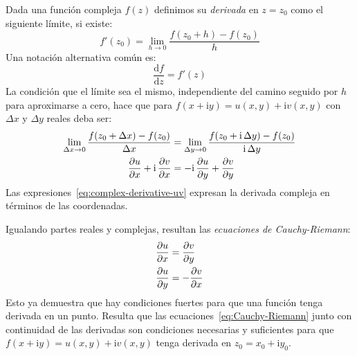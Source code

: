   Dada una función compleja \(f(z)\)
  definimos su \emph{derivada} en \(z = z_0\)%
  como el siguiente límite,
  si existe:
  \begin{equation}
    \label{eq:complex-derivative}
    f'(z_0)
      = \lim_{h \rightarrow 0} \frac{f(z_0 + h) - f(z_0)}{h}
  \end{equation}
  Una notación alternativa común es:
  \begin{equation*}
    \frac{\mathrm{d} f}{\mathrm{d} z}
      = f'(z)
  \end{equation*}
  La condición que el límite sea el mismo,
  independiente del camino seguido por \(h\)
  para aproximarse a cero,
  hace que para
    \(f(x + \mathrm{i} y) = u(x, y) + \mathrm{i} v(x, y)\)
  con \(\Delta x\) y \(\Delta y\) reales deba ser:
  \begin{align}
    \lim_{\Delta x \rightarrow 0}
       \frac{f(z_0 + \Delta x) - f(z_0)}{\Delta x}
      &= \lim_{\Delta y \rightarrow 0}
	   \frac{f(z_0 + \mathrm{i} \, \Delta y) - f(z_0)}
		{\mathrm{i} \, \Delta y}
	     \notag \\
    \frac{\partial u}{\partial x}
      + \mathrm{i} \, \frac{\partial v}{\partial x}
      &= - \mathrm{i} \, \frac{\partial u}{\partial y}
	     + \frac{\partial v}{\partial y}
	     \label{eq:complex-derivative-uv}
  \end{align}
  Las expresiones~\eqref{eq:complex-derivative-uv}
  expresan la derivada compleja en términos de las coordenadas.

  Igualando partes reales y complejas,
  resultan las \emph{ecuaciones de Cauchy-Riemann}:
  \begin{equation}
    \label{eq:Cauchy-Riemann}
    \index{Cauchy-Riemann, ecuaciones de|textbfhy}
    \begin{split}
      \frac{\partial u}{\partial x}
	&= \frac{\partial v}{\partial y} \\
      \frac{\partial u}{\partial y}
	&= - \frac{\partial v}{\partial x}
    \end{split}
  \end{equation}
  Esto ya demuestra que hay condiciones fuertes
  para que una función tenga derivada en un punto.
  Resulta que las ecuaciones~\eqref{eq:Cauchy-Riemann}
  junto con continuidad de las derivadas
  son condiciones necesarias y suficientes
  para que \(f(x + \mathrm{i} y) = u(x, y) + \mathrm{i} v(x, y)\)
  tenga derivada en \(z_0 = x_0 + \mathrm{i} y_0\).

